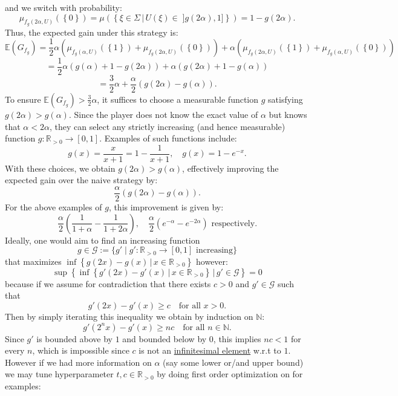 \documentclass[11pt, a4paper, oneside]{article}
\theoremstyle{remark}
\theoremstyle{lemma}
\begin{document}
and we switch with probability:
\[
\mu_{f_g\left(2\alpha, U\right)}\left(\left\{0\right\}\right)=\mu\left(\left\{\xi\in\Sigma\,|\, U\left(\xi\right)\in\;]g\left(2\alpha\right),1]\right\}\right)=1-g\left(2\alpha\right).
\]
Thus, the expected gain under this strategy is:
\[
\mathbb{E}\left(G_{f_g}\right) = \frac{1}{2} \alpha \left( \mu_{f_g\left(\alpha, U\right)}\left(\left\{1\right\}\right) + \mu_{f_g\left(2\alpha, U\right)}\left(\left\{0\right\}\right) \right) + \alpha \left( \mu_{f_g\left(2\alpha, U\right)}\left(\left\{1\right\}\right) + \mu_{f_g\left(\alpha, U\right)}\left(\left\{0\right\}\right) \right)
\]
\[
= \frac{1}{2} \alpha \left( g\left(\alpha\right) + 1 - g\left(2\alpha\right) \right) + \alpha \left( g\left(2\alpha\right) + 1 - g\left(\alpha\right) \right)
\]
\[
= \frac{3}{2} \alpha + \frac{\alpha}{2} \left( g\left(2\alpha\right) - g\left(\alpha\right) \right).
\]
To ensure $\mathbb{E}\left(G_{f_g}\right) > \frac{3}{2} \alpha$, it suffices to choose a measurable function \( g \) satisfying \( g\left(2\alpha\right) > g\left(\alpha\right) \). Since the player does not know the exact value of \( \alpha \) but knows that \( \alpha < 2\alpha \), they can select any strictly increasing (and hence measurable) function \( g: \mathbb{R}_{>0} \to \left[0,1\right] \). Examples of such functions include:
\[
g\left(x\right) =\frac{x}{x+1}=1-\frac{1}{x+1}, \quad g\left(x\right) = 1 - e^{-x}.
\]
With these choices, we obtain \( g\left(2\alpha\right) > g\left(\alpha\right) \), effectively improving the expected gain over the naive strategy by:
\[
\frac{\alpha}{2} \left( g\left(2\alpha\right) - g\left(\alpha\right) \right).
\]
For the above examples of $g$, this improvement is given by:
\[
\frac{\alpha}{2} \left(\frac{1}{1+\alpha}- \frac{1}{1+2\alpha}\right), \quad \frac{\alpha}{2} \left( e^{-\alpha} - e^{-2\alpha} \right)\text{ respectively}.
\]
Ideally, one would aim to find an increasing function
\[
g\in\mathcal{G}:= \{g'\mid g':\mathbb{R}_{>0}\to[0,1]\text{ increasing}\}
\]
that maximizes \(\inf\left\{g\left(2x\right) - g\left(x\right)\,|\, x\in\mathbb{R}_{>0}\right\}\) however:
$$\sup\left\{\inf\left\{g'\left(2x\right) - g'\left(x\right)\,|\, x\in\mathbb{R}_{>0}\right\}\,|\, g'\in\mathcal{G}\right\}=0$$
because if we assume for contradiction that there exists \(c>0\) and $g'\in \mathcal{G}$ such that
\[
g'(2x)-g'(x)\ge c \quad \text{for all } x>0.
\]
Then by simply iterating this inequality we obtain by induction on $\mathbb{N}$:
\[
g'(2^n x)-g'(x) \ge nc \quad \text{for all } n\in\mathbb{N}.
\]
Since \(g'\) is bounded above by \(1\) and bounded below by $0$, this implies $nc< 1$ for every \(n\), which is impossible since $c$ is not an \href{https://en.wikipedia.org/wiki/Archimedean_property}{infinitesimal element} w.r.t to $1$. However if we had more information on $\alpha$ (say some lower or/and upper bound) we may tune hyperparameter $t,c\in\mathbb{R}_{>0}$ by doing first order optimization on for examples:
\end{document}

